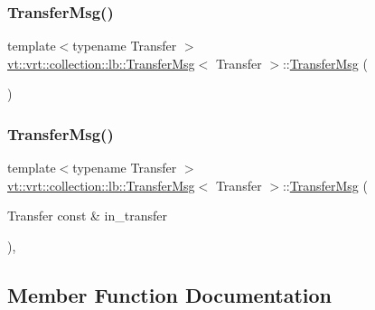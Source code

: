 \subsubsection{\texorpdfstring{Transfer\+Msg()}{TransferMsg()}\hspace{0.1cm}{\footnotesize\ttfamily [1/2]}}
{\footnotesize\ttfamily template$<$typename Transfer $>$ \\
\hyperlink{structvt_1_1vrt_1_1collection_1_1lb_1_1_transfer_msg}{vt\+::vrt\+::collection\+::lb\+::\+Transfer\+Msg}$<$ Transfer $>$\+::\hyperlink{structvt_1_1vrt_1_1collection_1_1lb_1_1_transfer_msg}{Transfer\+Msg} (\begin{DoxyParamCaption}{ }\end{DoxyParamCaption})\hspace{0.3cm}{\ttfamily [default]}}

\mbox{\label{structvt_1_1vrt_1_1collection_1_1lb_1_1_transfer_msg_a3f2753a92fc1d0fa93489b9adf102533}} 
\subsubsection{\texorpdfstring{Transfer\+Msg()}{TransferMsg()}\hspace{0.1cm}{\footnotesize\ttfamily [2/2]}}
{\footnotesize\ttfamily template$<$typename Transfer $>$ \\
\hyperlink{structvt_1_1vrt_1_1collection_1_1lb_1_1_transfer_msg}{vt\+::vrt\+::collection\+::lb\+::\+Transfer\+Msg}$<$ Transfer $>$\+::\hyperlink{structvt_1_1vrt_1_1collection_1_1lb_1_1_transfer_msg}{Transfer\+Msg} (\begin{DoxyParamCaption}\item[{Transfer const \&}]{in\+\_\+transfer }\end{DoxyParamCaption})\hspace{0.3cm}{\ttfamily [inline]}, {\ttfamily [explicit]}}



\subsection{Member Function Documentation}
\mbox{\label{structvt_1_1vrt_1_1collection_1_1lb_1_1_transfer_msg_a9c93bf7d69be7e2bff65999cc4fadf98}} 
